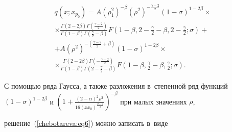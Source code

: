 \begin{multline}


\label{chebotareva:eq6}


q\left( {x; x_{p_0 } } \right)= A\left( {\rho _1^2 } \right)^{ -


\beta }\left( {\rho ^2} \right)^{ - \frac{\gamma - 2}{2}}\left( {1


- \sigma } \right)^{1 - 2\beta }\times \\ \times \frac{\Gamma \left( {2 -


2\beta } \right)\Gamma \left( {\frac{\gamma - 2}{2}}


\right)}{\Gamma \left( {1 - \beta } \right)\Gamma \left(


{\frac{\gamma }{2} - \beta } \right)}F\left( {1 - \beta , 2 -


\frac{\gamma


}{2} - \beta,  2 - \frac{\gamma }{2}; \sigma } \right) + \\


 + A\left( {\rho ^2} \right)^{ - \left( {\frac{\gamma - 2}{2} + \beta }


\right)}\left( {1 - \sigma } \right)^{1 - 2\beta }\times \\ \times


\frac{\Gamma \left( {2 - 2\beta } \right)\Gamma \left( { -


\frac{\gamma - 2}{2}} \right)}{\Gamma \left( {1 - \beta }


\right)\Gamma \left( {2 - \frac{\gamma }{2} - \beta }


\right)}F\left( 1 - \beta,  \frac{\gamma }{2} - \beta,  \frac{\gamma }{2};  \sigma  \right).


\end{multline}


С помощью ряда Гаусса, а также разложения в~степенной ряд функций  \linebreak $(1 {-} \sigma )^{1 {-}


2\beta }$ и $\left( {1 {+} \frac{\left( {2 {-} \alpha } \right)^2\rho


^2}{16\left( {xx_0 } \right)^{\frac{2 {-} \alpha }{2}}}} \right)^{ -


\beta }$ при малых значениях $\rho $, 


решение~(\ref{chebotareva:eq6}) можно записать в~виде


